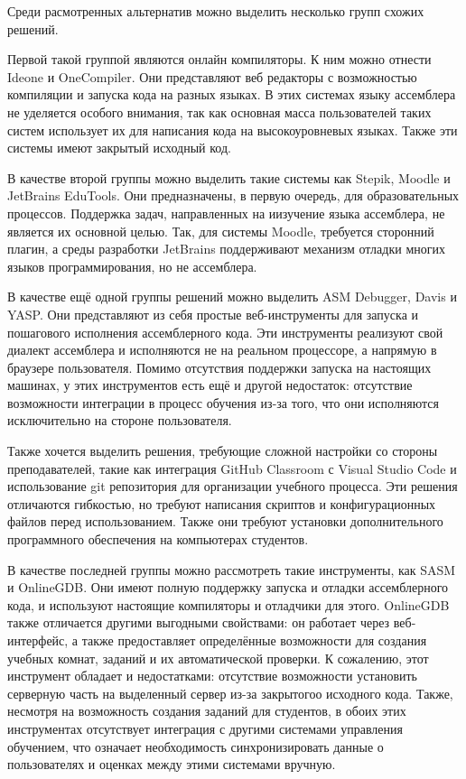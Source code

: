 \documentclass[a4paper,article,14pt]{extarticle}
\begin{document}
Среди расмотренных альтернатив можно выделить несколько групп схожих решений.

Первой такой группой являются онлайн компиляторы. К ним можно отнести Ideone и OneCompiler. Они представляют веб редакторы с возможностью компиляции и запуска кода на разных языках. В этих системах языку ассемблера не уделяется особого внимания, так как основная масса пользователей таких систем использует их для написания кода на высокоуровневых языках. Также эти системы имеют закрытый исходный код.

В качестве второй группы можно выделить такие системы как Stepik, Moodle и JetBrains EduTools. Они предназначены, в первую очередь, для образовательных процессов. Поддержка задач, направленных на иизучение языка ассемблера, не является их основной целью. Так, для системы Moodle, требуется сторонний плагин, а среды разработки JetBrains поддерживают механизм отладки многих языков программирования, но не ассемблера.

В качестве ещё одной группы решений можно выделить ASM Debugger, Davis и YASP. Они представляют из себя простые веб-инструменты для запуска и пошагового исполнения ассемблерного кода. Эти инструменты реализуют свой диалект ассемблера и исполняются не на реальном процессоре, а напрямую в браузере пользователя. Помимо отсутствия поддержки запуска на настоящих машинах, у этих инструментов есть ещё и другой недостаток: отсутствие возможности интеграции в процесс обучения из-за того, что они исполняются исключительно на стороне пользователя.

Также хочется выделить решения, требующие сложной настройки со стороны преподавателей, такие как интеграция GitHub Classroom с Visual Studio Code и использование git репозитория для организации учебного процесса. Эти решения отличаются гибкостью, но требуют написания скриптов и конфигурационных файлов перед использованием. Также они требуют установки дополнительного программного обеспечения на компьютерах студентов.

В качестве последней группы можно рассмотреть такие инструменты, как SASM и OnlineGDB. Они имеют полную поддержку запуска и отладки ассемблерного кода, и используют настоящие компиляторы и отладчики для этого. OnlineGDB также отличается другими выгодными свойствами: он работает через веб-интерфейс, а также предоставляет определённые возможности для создания учебных комнат, заданий и их автоматической проверки. К сожалению, этот инструмент обладает и недостатками: отсутствие возможности установить серверную часть на выделенный сервер из-за закрытогоо исходного кода. Также, несмотря на возможность создания заданий для студентов, в обоих этих инструментах отсутствует интеграция с другими системами управления обучением, что означает необходимость синхронизировать данные о пользователях и оценках между этими системами вручную.
\end{document}
